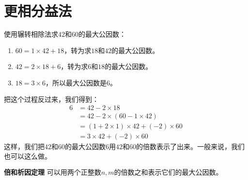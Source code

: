 \documentclass[12pt,UTF8]{ctexbook}
\begin{document}
\section{更相分益法}
使用辗转相除法求$42$和$60$的最大公因数：
\begin{enumerate}
    \item $60 = 1 \times 42 + 18$，转为求$18$和$42$的最大公因数。
    \item $42 = 2 \times 18 + 6$，转为求$6$和$18$的最大公因数。
    \item $18 = 3 \times 6$，所以最大公因数是$6$。
\end{enumerate}
把这个过程反过来，我们得到：
\begin{align*}
    6 &= 42 - 2 \times 18  \\
    &= 42 - 2 \times (60 - 1 \times 42)  \\
    &= (1 + 2\times 1) \times 42 + (-2) \times 60  \\
    &= 3 \times 42 + (-2) \times 60  
\end{align*}
这样，我们把$42$和$60$的最大公因数$6$用$42$和$60$的倍数表示了出来。一般来说，我们也可以这么做。
\begin{tm}{\textbf{倍和析因定理}}\label{tm:5-1-0}
    可以用两个正整数$n,m$的倍数之和表示它们的最大公因数。
\end{tm}
\end{document}
